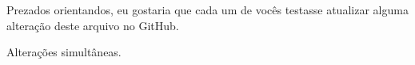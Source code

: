 \documentclass{article}
\begin{document}
Prezados orientandos,
eu gostaria que cada um de vocês testasse atualizar alguma alteração deste arquivo no GitHub.

Alterações simultâneas.
\end{document}
